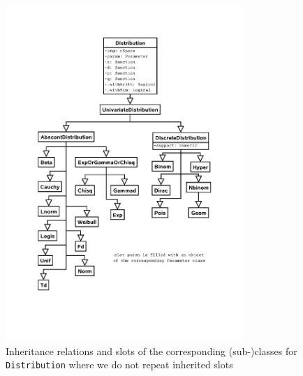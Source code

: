 \documentclass[11pt]{article}
\newcommand{\code}[1]{{\tt #1}}
\begin{document}
\ifpdf
\begin{figure}[!ht]\label{fig1}
\vspace{2ex}
  \begin{center}
    \includegraphics[viewport=130 150 500 750,width=9cm]{distribution.pdf}%
    \caption{\label{fig1c}{\footnotesize Inheritance relations and slots of the 
    corresponding \mbox{(sub-)}classes for \code{Distribution} where we do not
    repeat inherited slots
    }}
  \end{center}
\vspace{-4ex}
\end{figure}
\else
\end{document}
